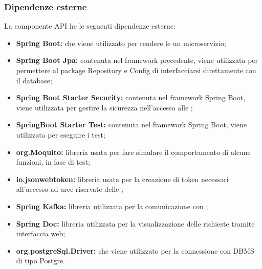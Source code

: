 	\subsubsection{Dipendenze esterne}
		La componente API he le seguenti dipendenze esterne:
		\begin{itemize}
			\item \textbf{Spring Boot:} che viene utilizzato per rendere le  un microservizio; 
			\item \textbf{Spring Boot Jpa:} contenuta nel framework precedente, viene utilizzata per permettere al package Repository e Config di interfacciarsi direttamente con il database;
			\item \textbf{Spring Boot Starter Security:} contenuta nel framework Spring Boot, viene utilizzata per gestire la sicurezza nell'accesso alle ;
			\item \textbf{SpringBoot Starter Test:} contenuta nel framework Spring Boot, viene utilizzata per eseguire i test;
			\item \textbf{org.Moquito:} libreria usata per fare simulare il comportamento di alcune funzioni, in fase di test;
			\item \textbf{io.jsonwebtoken:} libreria usata per la creazione di token necessari all'accesso ad aree riservate delle ;
			\item \textbf{Spring Kafka:} libreria utilizzata per la comunicazione con ;
			\item \textbf{Spring Doc:} libreria utilizzata per la visualizzazione delle richieste  tramite interfaccia web;
			\item \textbf{org.postgreSql.Driver:} che viene utilizzato per la connessione con DBMS di tipo Postgre.
		\end{itemize}

